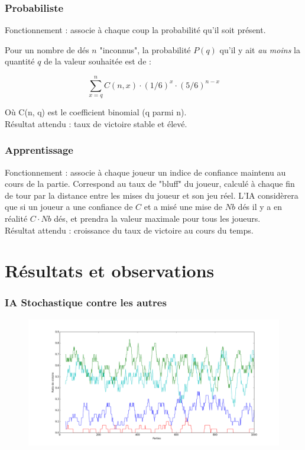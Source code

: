 \documentclass{beamer}
\begin{document}
\begin{frame}
  \frametitle{Probabiliste}

  Fonctionnement : associe à chaque coup la probabilité qu'il soit présent.

  Pour un nombre de dés $n$ "inconnus", la probabilité $P(q)$ qu'il y ait
  \emph{au moins} la quantité $q$ de la valeur souhaitée est de :

  $$
  \sum\limits_{x=q}^n C(n, x) \cdot (1/6)^x \cdot (5/6)^{n-x}
  $$

  Où C(n, q) est le coefficient binomial (q parmi n).
  \\[1cm]

  Résultat attendu : taux de victoire stable et élevé.
\end{frame}

\begin{frame}
  \frametitle{Apprentissage}

  Fonctionnement : associe à chaque joueur un indice de confiance maintenu au
  cours de la partie. Correspond au taux de "bluff" du joueur, calculé à chaque
  fin de tour par la distance entre les mises du joueur et son jeu réel. L'IA
  considèrera que si un joueur a une confiance de $C$ et a misé une mise de
  $Nb$ dés il y a en réalité $C \cdot Nb$ dés, et prendra la valeur maximale
  pour tous les joueurs.
  \\[1cm]
  Résultat attendu : croissance du taux de victoire au cours du temps.
\end{frame}

\section{Résultats et observations}

\begin{frame}
  \frametitle{IA Stochastique contre les autres}
  \begin{figure}
    \includegraphics[scale=0.265]{plot/ivre}
  \end{figure}
\end{frame}
\end{document}
